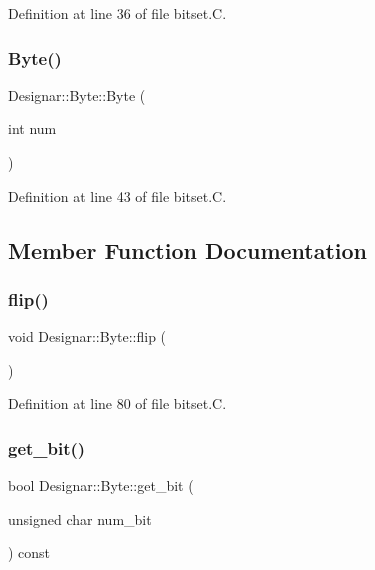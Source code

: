 Definition at line 36 of file bitset.\+C.

\mbox{\label{class_designar_1_1_byte_a0ca92bbee262c55827eb6b2c1ebaa39e}} 
\subsubsection{\texorpdfstring{Byte()}{Byte()}\hspace{0.1cm}{\footnotesize\ttfamily [3/3]}}
{\footnotesize\ttfamily Designar\+::\+Byte\+::\+Byte (\begin{DoxyParamCaption}\item[{int}]{num }\end{DoxyParamCaption})}



Definition at line 43 of file bitset.\+C.



\subsection{Member Function Documentation}
\mbox{\label{class_designar_1_1_byte_abb173606939fe9f5e1c7db0180aba9b0}} 
\subsubsection{\texorpdfstring{flip()}{flip()}}
{\footnotesize\ttfamily void Designar\+::\+Byte\+::flip (\begin{DoxyParamCaption}{ }\end{DoxyParamCaption})}



Definition at line 80 of file bitset.\+C.

\mbox{\label{class_designar_1_1_byte_a9f14a28a82353d48a802000c6de20c8e}} 
\subsubsection{\texorpdfstring{get\+\_\+bit()}{get\_bit()}}
{\footnotesize\ttfamily bool Designar\+::\+Byte\+::get\+\_\+bit (\begin{DoxyParamCaption}\item[{unsigned char}]{num\+\_\+bit }\end{DoxyParamCaption}) const}




